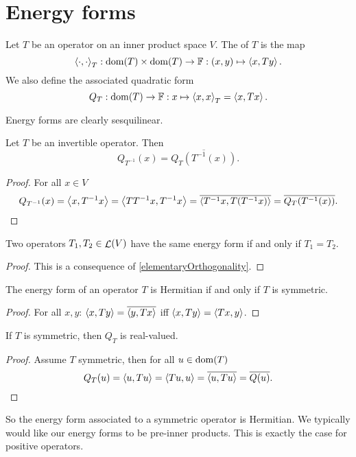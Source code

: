 \section{Energy forms}
\begin{definition}
Let $T$ be an operator on an inner product space $V$. The  of $T$ is the map
\[ \left\langle \cdot, \cdot \right\rangle_T: \operatorname{dom}(T)\times \operatorname{dom}(T) \to \mathbb{F}: (x,y) \mapsto \left\langle x,Ty \right\rangle. \]
We also define the associated quadratic form
\[ Q_T: \operatorname{dom}(T)\to \mathbb{F}: x\mapsto \left\langle x,x \right\rangle_T = \left\langle x,Tx \right\rangle. \]
\end{definition}
Energy forms are clearly sesquilinear.

\begin{lemma} \label{quadraticFormInverseOperator}
Let $T$ be an invertible operator. Then
\[ Q_{T^{-1}}(x) = \overline{Q_T(T^{-1}(x))}. \]
\end{lemma}
\begin{proof}
For all $x\in V$
\[ Q_{T^{-1}}(x) = \left\langle x,T^{-1}x \right\rangle = \left\langle TT^{-1}x, T^{-1}x \right\rangle = \overline{\left\langle T^{-1}x, T(T^{-1}x) \right\rangle} = \overline{Q_T(T^{-1}(x))}. \]
\end{proof}

\begin{lemma} \label{sameEnergyFormSameOperator}
Two operators $T_1,T_2\in \mathop{\mathcal{L}}(V)$ have the same energy form \textup{if and only if} $T_1 = T_2$.
\end{lemma}
\begin{proof}
This is a consequence of \ref{elementaryOrthogonality}.
\end{proof}

\begin{lemma} \label{energyFormHermitianSymmetric}
The energy form of an operator $T$ is Hermitian \textup{if and only if} $T$ is symmetric.
\end{lemma}
\begin{proof}
For all $x,y$: $\left\langle x,Ty \right\rangle = \overline{\left\langle y, Tx \right\rangle}$ iff $\left\langle x,Ty \right\rangle = \left\langle Tx, y \right\rangle$.
\end{proof}
\begin{corollary} \label{symmetricRealQuadraticForm}
If $T$ is symmetric, then $Q_T$ is real-valued.
\end{corollary}
\begin{proof}
Assume $T$ symmetric, then for all $u\in\operatorname{dom}(T)$
\[ Q_T(u) = \left\langle u,Tu \right\rangle = \left\langle Tu,u \right\rangle = \overline{\left\langle u,Tu \right\rangle} = \overline{Q(u)}. \]
\end{proof}

So the energy form associated to a symmetric operator is Hermitian. We typically would like our energy forms to be pre-inner products. This is exactly the case for positive operators.

